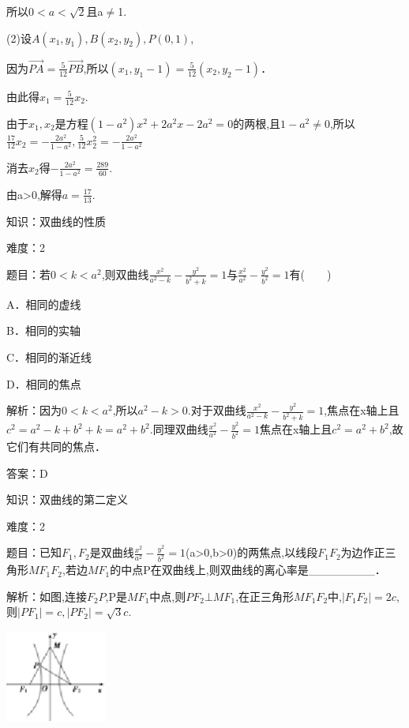 \documentclass{article} %
\begin{document}
所以$0<a<\sqrt{2}$且a${\neq}$1.

(2)设$A(x_{1},y_{1}),B(x_{2},y_{2}),P(0,1)$,

因为$\overrightarrow{PA}=\frac{5}{12}\overrightarrow{PB}$,所以$(x_{1},y_{1}-1)=\frac{5}{12}(x_{2},y_{2}-1)$．

由此得$x_{1}=\frac{5}{12}x_{2}$.

由于$x_{1},x_{2}$是方程$(1-a^{2})x^{2}+2a^{2}x-2a^{2}=0$的两根,且$1-a^{2}\ne0$,所以$\frac{17}{12}x_2=-\frac{2a^2}{1-a^2},\frac{5}{12}x_2^2=-\frac{2a^2}{1-a^2}$

消去$x_{2}$得$-\frac{2a^2}{1-a^2}=\frac{289}{60}$.

由a>0,解得$a=\frac{17}{13}$.



知识：双曲线的性质

难度：2

题目：若$0<k<a^{2}$,则双曲线$\frac{x^2}{a^2-k}-\frac{y^2}{b^2+k}=1$与$\frac{x^2}{a^2}-\frac{y^2}{b^2}=1$有(　　)

A．相同的虚线   

B．相同的实轴

C．相同的渐近线   

D．相同的焦点

解析：因为$0<k<a^{2}$,所以$a^{2}-k>0$.对于双曲线$\frac{x^2}{a^2-k}-\frac{y^2}{b^2+k}=1$,焦点在x轴上且$c^{2}=a^{2}-k+b^{2}+k=a^{2}+b^{2}$.同理双曲线$\frac{x^2}{a^2}-\frac{y^2}{b^2}=1$焦点在x轴上且$c^{2}=a^{2}+b^{2}$,故它们有共同的焦点．

答案：D



知识：双曲线的第二定义

难度：2

题目：已知$F_{1},F_{2}$是双曲线$\frac{x^2}{a^2}-\frac{y^2}{b^2}=1$(a>0,b>0)的两焦点,以线段$F_{1}F_{2}$为边作正三角形$MF_{1}F_{2}$,若边$MF_{1}$的中点P在双曲线上,则双曲线的离心率是\_\_\_\_\_\_\_\_．

解析：如图,连接$F_{2}P$,P是$MF_{1}$中点,则$PF_{2}{\bot}MF_{1}$,在正三角形$MF_{1}F_{2}$中,$|F_1F_2|=2c$,则$|PF_1|=c, |PF_2|=\sqrt{3}c$.

\includegraphics*[width=1.30in, height=1.20in, keepaspectratio=false]{image6}
\end{document}
